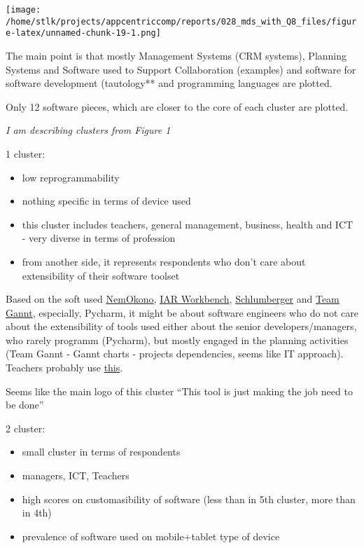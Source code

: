 \documentclass[]{article}
\providecommand{\tightlist}{%
  \setlength{\itemsep}{0pt}\setlength{\parskip}{0pt}}
\begin{document}
\texttt{[image: /home/stlk/projects/appcentriccomp/reports/028\_mds\_with\_Q8\_files/figure-latex/unnamed-chunk-19-1.png]}

The main point is that mostly Management Systems (CRM systems), Planning
Systems and Software used to Support Collaboration (examples) and
software for software development (tautology** and programming languages
are plotted.

Only 12 software pieces, which are closer to the core of each cluster
are plotted.

\emph{I am describing clusters from Figure 1}

1 cluster:

\begin{itemize}
\tightlist
\item
  low reprogrammability
\item
  nothing specific in terms of device used
\item
  this cluster includes teachers, general management, business, health
  and ICT - very diverse in terms of profession
\item
  from another side, it represents respondents who don't care about
  extensibility of their software toolset
\end{itemize}

Based on the soft used \href{https://www.nemkonto.dk/}{NemOkono},
\href{https://www.iar.com/iar-embedded-workbench/}{IAR Workbench},
\href{https://www.software.slb.com/}{Schlumberger} and
\href{https://www.teamgantt.com/}{Team Gannt}, especially, Pycharm, it
might be about software engineers who do not care about the
extensibility of tools used either about the senior developers/managers,
who rarely programm (Pycharm), but mostly engaged in the planning
activities (Team Gannt - Gannt charts - projects dependencies, seems
like IT approach). Teachers probably use
\href{https://easyiq.dk/skoleportal/}{this}.

Seems like the main logo of this cluster ``This tool is just making the
job need to be done''

2 cluster:

\begin{itemize}
\tightlist
\item
  small cluster in terms of respondents
\item
  managers, ICT, Teachers
\item
  high scores on customasibility of software (less than in 5th cluster,
  more than in 4th)
\item
  prevalence of software used on mobile+tablet type of device
\end{itemize}
\end{document}
